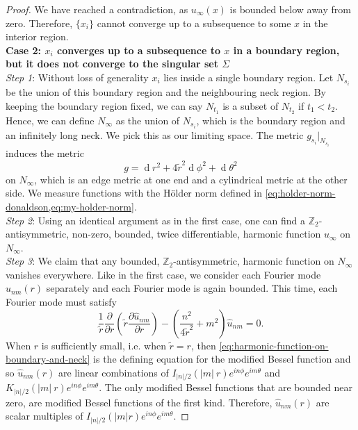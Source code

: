\documentclass[preprint,12pt]{elsarticle}
\numberwithin{table}{section}
\newcommand{\Z}{\mathbb{Z}}
\newcommand{\del}{\partial}
\renewcommand{\d}{\operatorname{d}\!}
\begin{document}
\begin{proof}
	We have reached a contradiction, as $u_\infty(x)$ is bounded below away from zero. Therefore, $\{x_i\}$ cannot converge up to a subsequence to some $x$ in the interior region.
	\\

	\noindent
	\textbf{Case 2: $x_i$ converges up to a subsequence to $x$ in a boundary region, but it does not converge to the singular set $\Sigma$} \\
	\textit{Step 1}: Without loss of generality $x_i$ lies inside a single boundary region. Let $N_{s_i}$ be the union of this boundary region and the neighbouring neck region. By keeping the boundary region fixed, we can say $N_{t_1}$ is a subset of $N_{t_2}$ if $t_1 < t_2$. Hence, we can define $N_\infty$ as the union of $N_{s_i}$, which is the boundary region and an infinitely long neck. We pick this as our limiting space. 
	The metric $g_{s_i}|_{N_{s_i}}$ induces the metric 
	$$
	g = \d r^2 + 4\tilde{r}^2 \d \phi^2 + \d \theta^2
	$$
	on $N_\infty$, which is an edge metric at one end and a cylindrical metric at the other side. We measure functions with the H\"older norm defined in \cref{eq:holder-norm-donaldson,eq:my-holder-norm}.
	\\

	\noindent
	\textit{Step 2}: Using an identical argument as in the first case, one can find a $\Z_2$-antisymmetric, non-zero, bounded, twice differentiable, harmonic function $u_\infty$ on $N_\infty$.
	\\

	\noindent
	\textit{Step 3}:  We claim that any bounded, $\Z_2$-antisymmetric, harmonic function on $N_\infty$ vanishes everywhere. Like in the first case, we consider each Fourier mode $\hat{u}_{nm}(r)$ separately and each Fourier mode is again bounded. This time, each Fourier mode must satisfy
	\begin{equation}
		\label{eq:harmonic-function-on-boundary-and-neck}
		\frac{1}{\tilde{r}}
		\frac{\del}{\del r} \left(\tilde{r} \frac{\del \hat{u}_{nm}}{\del r}\right)
		 - \left(\frac{n^2}{4 \tilde{r}^2} + m^2\right) \hat{u}_{nm} = 0.
	\end{equation}
	When $r$ is sufficiently small, i.e. when $\tilde{r} = r$, then \cref{eq:harmonic-function-on-boundary-and-neck} is the defining equation for the modified Bessel function and so $\hat{u}_{nm}(r)$ are linear combinations of $I_{|n|/2}(|m| \:r) e^{in \phi} e^{im \theta}$ and $K_{|n|/2}(|m| \:r) e^{in \phi} e^{im \theta}$. The only modified Bessel functions that are bounded near zero, are modified Bessel functions of the first kind. Therefore, $\hat{u}_{nm}(r)$ are scalar multiples of $I_{|n|/2}(|m| r) e^{in \phi} e^{im \theta}$.


\end{proof}
\end{document}
